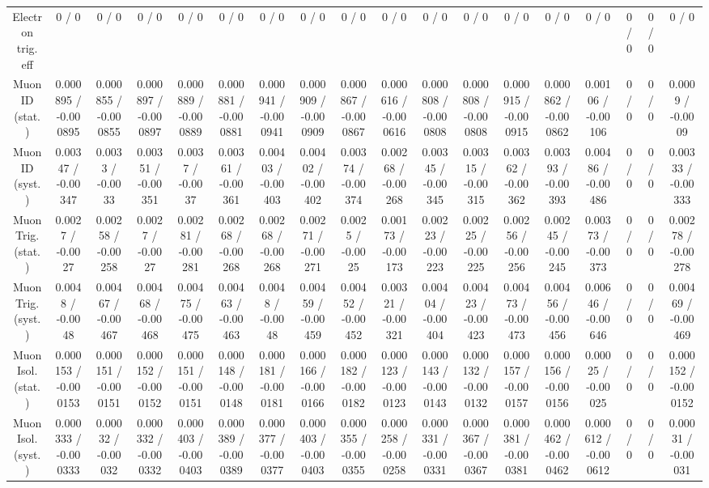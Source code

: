 \documentclass[10pt]{article}
\begin{document}
\begin{table}[htbp]
\begin{center}
\begin{tabular}{|c|c|c|c|c|c|c|c|c|c|c|c|c|c|c|c|c|c|}
  Electron trig. eff & 0 / 0 & 0 / 0 & 0 / 0 & 0 / 0 & 0 / 0 & 0 / 0 & 0 / 0 & 0 / 0 & 0 / 0 & 0 / 0 & 0 / 0 & 0 / 0 & 0 / 0 & 0 / 0 & 0 / 0 & 0 / 0 & 0 / 0 \\ 
  Muon ID (stat.) & 0.000895 / -0.000895 & 0.000855 / -0.000855 & 0.000897 / -0.000897 & 0.000889 / -0.000889 & 0.000881 / -0.000881 & 0.000941 / -0.000941 & 0.000909 / -0.000909 & 0.000867 / -0.000867 & 0.000616 / -0.000616 & 0.000808 / -0.000808 & 0.000808 / -0.000808 & 0.000915 / -0.000915 & 0.000862 / -0.000862 & 0.00106 / -0.00106 & 0 / 0 & 0 / 0 & 0.0009 / -0.0009 \\ 
  Muon ID (syst.) & 0.00347 / -0.00347 & 0.0033 / -0.0033 & 0.00351 / -0.00351 & 0.0037 / -0.0037 & 0.00361 / -0.00361 & 0.00403 / -0.00403 & 0.00402 / -0.00402 & 0.00374 / -0.00374 & 0.00268 / -0.00268 & 0.00345 / -0.00345 & 0.00315 / -0.00315 & 0.00362 / -0.00362 & 0.00393 / -0.00393 & 0.00486 / -0.00486 & 0 / 0 & 0 / 0 & 0.00333 / -0.00333 \\ 
  Muon Trig. (stat.) & 0.0027 / -0.0027 & 0.00258 / -0.00258 & 0.0027 / -0.0027 & 0.00281 / -0.00281 & 0.00268 / -0.00268 & 0.00268 / -0.00268 & 0.00271 / -0.00271 & 0.0025 / -0.0025 & 0.00173 / -0.00173 & 0.00223 / -0.00223 & 0.00225 / -0.00225 & 0.00256 / -0.00256 & 0.00245 / -0.00245 & 0.00373 / -0.00373 & 0 / 0 & 0 / 0 & 0.00278 / -0.00278 \\ 
  Muon Trig. (syst.) & 0.0048 / -0.0048 & 0.00467 / -0.00467 & 0.00468 / -0.00468 & 0.00475 / -0.00475 & 0.00463 / -0.00463 & 0.0048 / -0.0048 & 0.00459 / -0.00459 & 0.00452 / -0.00452 & 0.00321 / -0.00321 & 0.00404 / -0.00404 & 0.00423 / -0.00423 & 0.00473 / -0.00473 & 0.00456 / -0.00456 & 0.00646 / -0.00646 & 0 / 0 & 0 / 0 & 0.00469 / -0.00469 \\ 
  Muon Isol. (stat.) & 0.000153 / -0.000153 & 0.000151 / -0.000151 & 0.000152 / -0.000152 & 0.000151 / -0.000151 & 0.000148 / -0.000148 & 0.000181 / -0.000181 & 0.000166 / -0.000166 & 0.000182 / -0.000182 & 0.000123 / -0.000123 & 0.000143 / -0.000143 & 0.000132 / -0.000132 & 0.000157 / -0.000157 & 0.000156 / -0.000156 & 0.00025 / -0.00025 & 0 / 0 & 0 / 0 & 0.000152 / -0.000152 \\ 
  Muon Isol. (syst.) & 0.000333 / -0.000333 & 0.00032 / -0.00032 & 0.000332 / -0.000332 & 0.000403 / -0.000403 & 0.000389 / -0.000389 & 0.000377 / -0.000377 & 0.000403 / -0.000403 & 0.000355 / -0.000355 & 0.000258 / -0.000258 & 0.000331 / -0.000331 & 0.000367 / -0.000367 & 0.000381 / -0.000381 & 0.000462 / -0.000462 & 0.000612 / -0.000612 & 0 / 0 & 0 / 0 & 0.00031 / -0.00031 \\ 

\end{tabular}
\end{center}
\end{table}
\end{document}
